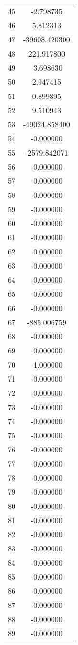 \documentclass[12pt]{article}
\begin{document}
\begin{longtable}{@{}cc@{}}
45 & -2.798735 \\
46 & 5.812313 \\
47 & -39608.420300 \\
48 & 221.917800 \\
49 & -3.698630 \\
50 & 2.947415 \\
51 & 0.899895 \\
52 & 9.510943 \\
53 & -49024.858400 \\
54 & -0.000000 \\
55 & -2579.842071 \\
56 & -0.000000 \\
57 & -0.000000 \\
58 & -0.000000 \\
59 & -0.000000 \\
60 & -0.000000 \\
61 & -0.000000 \\
62 & -0.000000 \\
63 & -0.000000 \\
64 & -0.000000 \\
65 & -0.000000 \\
66 & -0.000000 \\
67 & -885.006759 \\
68 & -0.000000 \\
69 & -0.000000 \\
70 & -1.000000 \\
71 & -0.000000 \\
72 & -0.000000 \\
73 & -0.000000 \\
74 & -0.000000 \\
75 & -0.000000 \\
76 & -0.000000 \\
77 & -0.000000 \\
78 & -0.000000 \\
79 & -0.000000 \\
80 & -0.000000 \\
81 & -0.000000 \\
82 & -0.000000 \\
83 & -0.000000 \\
84 & -0.000000 \\
85 & -0.000000 \\
86 & -0.000000 \\
87 & -0.000000 \\
88 & -0.000000 \\
89 & -0.000000 \\

\end{longtable}
\end{document}
